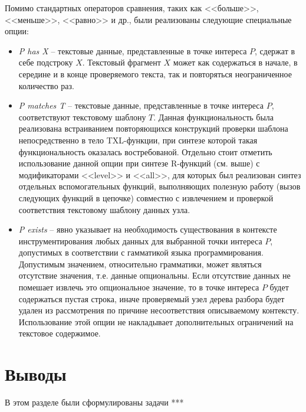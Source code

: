 Помимо стандартных операторов сравнения, таких как <<больше>>, <<меньше>>, <<равно>> и др., были реализованы следующие специальные опции:
\begin{itemize}[noitemsep]
  \item \textit{P has X} --
  текстовые данные, представленные в точке интереса $P$, сдержат в себе подстроку $X$.
  Текстовый фрагмент $X$ может как содержаться в начале, в середине и в конце проверяемого текста, так и повторяться неограниченное количество раз.

  \item \textit{P matches T} --
  текстовые данные, представленные в точке интереса $P$, соответствуют текстовому шаблону $T$.
  Данная функциональность была реализована встраиванием повторяющихся конструкций проверки шаблона непосредственно в тело TXL-функции, при синтезе которой такая функциональность оказалась востребованой.
  Отдельно стоит отметить использование данной опции при синтезе R-функций (см. выше) с модификаторами <<level>> и <<all>>, для которых был реализован синтез отдельных вспомогательных функций, выполняющих полезную работу (вызов следующих функций в цепочке) совместно с извлечением и проверкой соответствия текстовому шаблону данных узла.

  \item \textit{P exists} --
  явно указывает на необходимость существования в контексте инструментирования любых данных для выбранной точки интереса $P$, допустимых в соответствии с гамматикой языка программирования.
  Допустимым значением, относительно грамматики, может являться отсутствие значения, т.е. данные опциональны.
  Если отсутствие данных не помешает извлечь это опциональное значение, то в точке интереса $P$ будет содержаться пустая строка, иначе проверяемый узел дерева разбора будет удален из рассмотрения по причине несоответствия описываемому контексту. 
  Использование этой опции не накладывает дополнительных ограничений на текстовое содержимое.
\end{itemize}

\section{Выводы}

В этом разделе были сформулированы задачи
***
